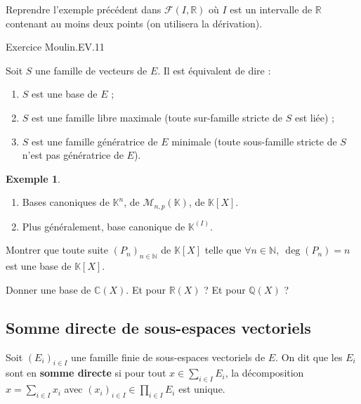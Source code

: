 \documentclass[french]{article}
\newcommand{\N}{\mathbb{N}}
\newcommand{\Q}{\mathbb{Q}}
\newcommand{\R}{\mathbb{R}}
\newcommand{\C}{\mathbb{C}}
\newcommand{\K}{\mathbb{K}}
\theoremstyle{plain}
\theoremstyle{definition}
\newtheorem*{ex}{Exemple}
\theoremstyle{remark}
\begin{document}
\begin{exo}
	Reprendre l'exemple précédent dans $\mathcal{F}(I,\R)$ où $I$ est un intervalle de $\R$ contenant au moins deux points (on utilisera la dérivation).
\end{exo}

Exercice Moulin.EV.11

\begin{thm}
	Soit $S$ une famille de vecteurs de $E$. Il est équivalent de dire :
	\begin{enumerate}[label=(\roman*)]
		\item $S$ est une base de $E$ ;
		\item $S$ est une famille libre maximale (toute sur-famille stricte de $S$ est liée) ;
		\item $S$ est une famille génératrice de $E$ minimale (toute sous-famille stricte de $S$ n'est pas génératrice de $E$).
	\end{enumerate}
\end{thm}

\begin{ex}
	\begin{enumerate}
		\item Bases canoniques de $\K^n$, de $\mathcal{M}_{n,p}(\K)$, de $\K[X]$.
		\item Plus généralement, base canonique de $\K^{(I)}$.
	\end{enumerate}
\end{ex}

\begin{exo}
	Montrer que toute suite $(P_n)_{n\in\N}$ de $\K[X]$ telle que $\forall n\in\N,\ \deg(P_n)=n$ est une base de $\K[X]$.
\end{exo}

\begin{exo}
	Donner une base de $\C(X)$. Et pour $\R(X)$ ? Et pour $\Q(X)$ ? %
\end{exo}
\subsection{Somme directe de sous-espaces vectoriels}

\begin{dfn}
	Soit $(E_i)_{i\in I}$ une famille finie de sous-espaces vectoriels de $E$. On dit que les $E_i$ sont en \textbf{somme directe} si pour tout $x\in\displaystyle\sum_{i\in I} E_i$, la décomposition $\displaystyle x=\sum_{i\in I}x_i$ avec $(x_i)_{i\in I}\in\displaystyle\prod_{i\in I} E_i$ est unique.
\end{dfn}
\end{document}
